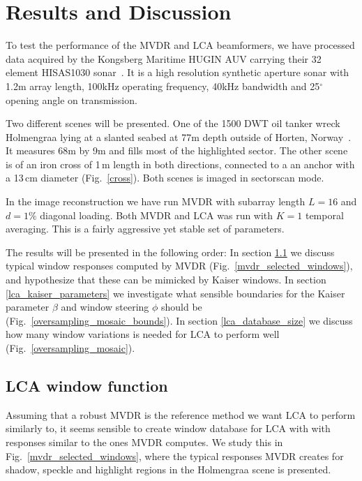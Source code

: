 \documentclass[10pt,journal,draftclsnofoot,onecolumn]{IEEEtran}
\newcommand\Fig[1]{Fig.~\ref{#1}}
\newcommand\1{\vec 1}
\begin{document}
\section{Results and Discussion}\label{results_discussion}


To test the performance of the MVDR and LCA beamformers, we have processed data acquired by the Kongsberg Maritime HUGIN AUV carrying their 32 element HISAS1030 sonar~\cite{Hansen2009}. It is a high resolution synthetic aperture sonar with 1.2\;m array length, 100\;kHz operating frequency, 40\;kHz bandwidth and 25$^\circ$ opening angle on transmission.

Two different scenes will be presented. One of the 1500 DWT oil tanker wreck Holmengraa lying at a slanted seabed at 77\;m depth outside of Horten, Norway~\cite{holmengraa}. It measures 68\;m by 9\;m and fills most of the highlighted sector. The other scene is of an iron cross of 1\,m length in both directions, connected to a an anchor with a 13\,cm diameter (\Fig{cross}). Both scenes is imaged in sectorscan mode.

In the image reconstruction we have run MVDR with subarray length $L=16$ and $d=1\%$ diagonal loading. Both MVDR and LCA was run with $K=1$ temporal averaging. This is a fairly aggressive yet stable set of parameters. 

The results will be presented in the following order: In section \ref{lca_window_function} we discuss typical window responses computed by MVDR (\Fig{mvdr_selected_windows}), and hypothesize  that these can be mimicked by Kaiser windows. In section \ref{lca_kaiser_parameters} we investigate what sensible boundaries for the Kaiser parameter $\beta$ and window steering $\phi$ should be (\Fig{oversampling_mosaic_bounds}). In section \ref{lca_database_size} we discuss how many window variations is needed for LCA to perform well (\Fig{oversampling_mosaic}). 

\subsection{LCA window function}\label{lca_window_function}

Assuming that a robust MVDR is the reference method we want LCA to perform similarly to, it seems sensible to create window database for LCA with with responses similar to the ones MVDR computes. We study this in \Fig{mvdr_selected_windows}, where the typical responses MVDR creates for shadow, speckle and highlight regions in the Holmengraa scene is presented.
\end{document}
